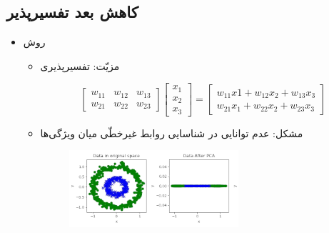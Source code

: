 
\label{Sec:Compare}
\subsection
[کاهش بعد تفسیرپذیر]{کاهش بعد تفسیرپذیر}
\begin{rawslide}


\begin{itemize}
\item 	
روش
\large{}\normalsize
\begin{itemize}
	\item 
	مزیّت: تفسیرپذیری
	\begin{latin}
		$$\begin{bmatrix}
		w_{11} & w_{12} & w_{13} \\
		w_{21} & w_{22} & w_{23}
		\end{bmatrix}
		\begin{bmatrix}
		x_1\\
		x_2\\
		x_3
		\end{bmatrix} = 
		\begin{bmatrix}
		w_{11} x1 + w_{12} x_2 + w_{13} x_3\\
		w_{21} x_1 + w_{22} x_2 + w_{23} x_3
		\end{bmatrix}$$
	\end{latin}
	\item 
	مشکل: عدم توانایی در شناسایی روابط غیرخطّی میان ویژگی‌ها
	\begin{figure}[h!]
		\centering
		\includegraphics[width=0.63\textwidth]{pic5.png}
	\end{figure}
\end{itemize}
\end{itemize}

\end{rawslide}
